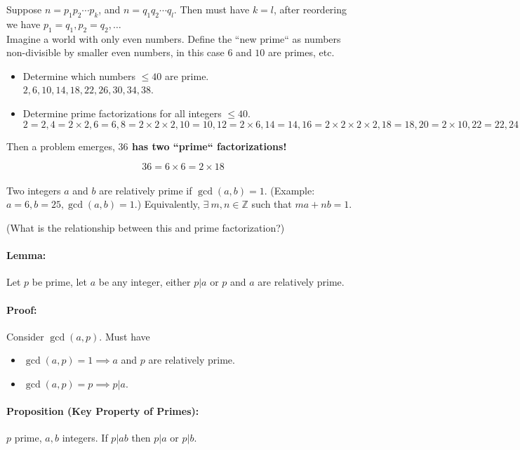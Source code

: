 \documentclass[a4paper, 11pt, twoside]{article}
\begin{document}
Suppose $n=p_1p_2\cdots p_k$, and $n=q_1q_2\cdots q_l$. Then must have $k=l$, after reordering we have $p_1=q_1, p_2=q_2, \dots$\\

Imagine a world with only even numbers. Define the ``new prime`` as numbers non-divisible by smaller even numbers, in this case $6$ and $10$ are primes, etc.

\begin{itemize}
	\item Determine which numbers $\leq 40$ are prime.\\
	$2, 6, 10, 14, 18, 22, 26, 30, 34, 38$.
	\item Determine prime factorizations for all integers $\leq 40$.\\
	$2=2, 4=2\times 2, 6=6, 8=2\times 2\times 2, 10=10, 12 = 2\times 6, 14=14, 16=2\times 2\times 2 \times 2, 18=18, 20=2\times 10, 22=22, 24= 2\times 2\times 6, 26=26, 28=2\times 14, 30 = 30, 32=2\times 2\times 2\times 2\times 2, 34=34, 36=2\times 18=6\times 6, 40 = 2\times 2\times 10.$
\end{itemize}

Then a problem emerges, \textbf{$36$ has two ``prime`` factorizations!}

\[36=6\times 6=2\times 18\]\\

Two integers $a$ and $b$ are relatively prime if $\gcd(a,b)=1.$ (Example: $a=6, b=25, \gcd(a,b)=1.$) Equivalently, $\exists\ m,n \in\mathbb{Z}$ such that $ma+nb=1$.

(What is the relationship between this and prime factorization?)

\paragraph{Lemma:} Let $p$ be prime, let $a$ be any integer, either $p|a$ or $p$ and $a$ are relatively prime.

\paragraph{Proof:} Consider $\gcd(a,p)$. Must have

\begin{itemize}
	\item $\gcd(a,p)=1\implies a$ and $p$ are relatively prime.
	\item $\gcd(a,p)=p\implies p|a$.
\end{itemize}

\paragraph{Proposition (Key Property of Primes):} $p$ prime, $a,b$ integers. If $p|ab$ then $p|a$ or $p|b$.
\end{document}
